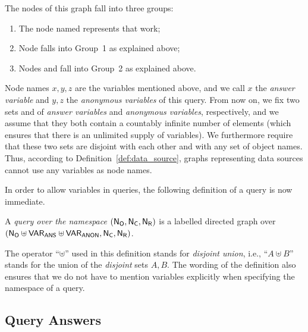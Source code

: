 The nodes of this graph fall into three groups:
%
\begin{enumerate}[(1)]
  \item
    The node named  represents that work;
  \item
    Node  falls into Group~1 as explained above;
  \item
    Nodes  and 
    fall into Group~2 as explained above.
\end{enumerate}
%
Node names $x,y,z$ are the variables mentioned above,
and we call $x$ the \emph{answer variable} and $y,z$ the \emph{anonymous variables}
of this query.
From now on, we fix two sets \VARANS and \VARANON
of \emph{answer variables} and \emph{anonymous variables}, respectively,
and we assume that they both contain a countably infinite number of elements
(which ensures that there is an unlimited supply of variables).
We furthermore require that these two sets are disjoint with each other
and with any set \NO of object names.
Thus, according to Definition~\ref{def:data_source},
graphs representing data sources cannot use any variables as node names.

In order to allow variables in queries,
the following definition of a query is now immediate. 
%
\begin{definition}
  A \emph{query over the namespace $(\mathsf{N}_\mathsf{O},\mathsf{N}_\mathsf{C},\mathsf{N}_\mathsf{R})$} is a labelled directed graph
  over $(\mathsf{N}_\mathsf{O} \uplus \mathsf{VAR}_\mathsf{ANS} \uplus \mathsf{VAR}_\mathsf{ANON}, \mathsf{N}_\mathsf{C}, \mathsf{N}_\mathsf{R})$.
\end{definition}
%
The operator \enquote{$\uplus$} used in this definition
stands for \emph{disjoint union}, i.e., \enquote{$A \uplus B$}
stands for the union of the \emph{disjoint} sets $A,B$.
The wording of the definition also ensures
that we do not have to mention variables explicitly when specifying the
namespace of a query.

\subsection{Query Answers}

